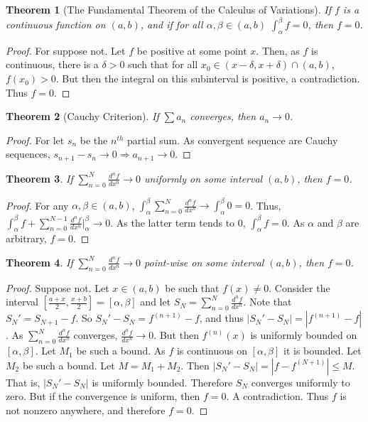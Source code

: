 \documentclass[12pt,oneside]{book}
\theoremstyle{mystyle}
\newtheorem{theorem}{Theorem}[section]
\begin{document}
\begin{theorem}[The Fundamental Theorem of the Calculus of Variations]
If $f$ is a continuous function on $(a,b)$, and if for all $\alpha,\beta\in (a,b)$ $\int_{\alpha}^{\beta}f = 0$, then $f=0$.
\end{theorem}
\begin{proof}
For suppose not. Let $f$ be positive at some point $x$. Then, as $f$ is continuous, there is a $\delta>0$ such that for all $x_0\in (x-\delta,x+\delta)\cap(a,b)$, $f(x_0)>0$. But then the integral on this subinterval is positive, a contradiction. Thus $f=0$.
\end{proof}

\begin{theorem}[Cauchy Criterion]
If $\sum a_n$ converges, then $a_n \rightarrow 0$.
\end{theorem}
\begin{proof}
For let $s_n$ be the $n^{th}$ partial sum. As convergent sequence are Cauchy sequences, $s_{n+1}-s_n \rightarrow 0\Rightarrow a_{n+1}\rightarrow 0$.
\end{proof}

\begin{theorem}
If $\sum_{n=0}^{N} \frac{d^{n}f}{dx^n} \rightarrow 0$ uniformly on some interval $(a,b)$, then $f=0$.
\end{theorem}
\begin{proof}
For any $\alpha, \beta\in (a,b)$, $\int_{\alpha}^{\beta} \sum_{n=0}^{N} \frac{d^{n}f}{dx^n} \rightarrow \int_{\alpha}^{\beta} 0 = 0$. Thus, $\int_{\alpha}^{\beta} f + \sum_{n=0}^{N-1} \frac{d^n f}{dx^n}\bigg|_{\alpha}^{\beta} \rightarrow 0$. As the latter term tends to $0$, $\int_{\alpha}^{\beta} f = 0$. As $\alpha$ and $\beta$ are arbitrary, $f=0$.
\end{proof}

\begin{theorem}
If $\sum_{n=0}^{N} \frac{d^n f}{dx^n} \rightarrow 0$ point-wise on some interval $(a,b)$, then $f=0$.
\end{theorem}
\begin{proof}
Suppose not. Let $x\in (a,b)$ be such that $f(x)\ne 0$. Consider the interval $[\frac{a+x}{2},\frac{x+b}{2}]=[\alpha,\beta]$ and let $S_N =\sum_{n=0}^{N} \frac{d^n f}{dx^n}$. Note that $S_N' = S_{N+1}-f$. So $S_N' - S_N = f^{(n+1)}-f$, and thus $|S_N'-S_N| = |f^{(n+1)}-f|$. As $\sum_{n=0}^{N} \frac{d^n f}{dx^n}$ converges, $\frac{d^n f}{dx^n} \rightarrow 0$. But then $f^{(n)}(x)$ is uniformly bounded on $[\alpha,\beta]$. Let $M_1$ be such a bound. As $f$ is continuous on $[\alpha,\beta]$ it is bounded. Let $M_2$ be such a bound. Let $M=M_1+M_2$. Then $|S_N'-S_N| = |f-f^{(N+1)}|\leq M$. That is, $|S_N'-S_N|$ is uniformly bounded. Therefore $S_N$ converges uniformly to zero. But if the convergence is uniform, then $f=0$. A contradiction. Thus $f$ is not nonzero anywhere, and therefore $f=0$.
\end{proof}
\end{document}
